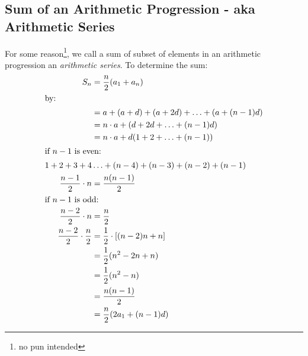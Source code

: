 \subsection{Sum of an Arithmetic Progression - aka Arithmetic Series}
\label{sec:ArithmeticSeries}
For some reason\footnote{no pun intended}, we call a sum of subset of elements
in an arithmetic progression an \emph{arithmetic series}. To determine the sum:
\begin{align}
  S_n
    &= \frac{n}{2}(a_1 + a_n) \label{eq:ArithmeticSum1}\\
  \intertext{by:}
    & = a + (a+d) + (a+2d) + \ldots + (a + (n-1)d) \\
    &= n\cdot a + (d + 2d + \ldots + (n-1)d) \\
    &= n\cdot a + d(1 + 2 + \ldots + (n-1)) \\
\intertext{if $n-1$ is even:}
    1 + 2 + 3 + 4 & \ldots + (n-4) + (n-3) + (n-2) + (n-1) \nonumber \\
    \frac{n-1}{2} \cdot n &= \frac{n(n-1)}{2} \\
\intertext{if $n-1$ is odd:}
    \frac{n-2}{2} \cdot n &= \frac{n}{2} \\
    \frac{n-2}{2} \cdot \frac{n}{2} &= \frac{1}{2}\cdot \left[(n-2)n + n\right] \\
    &= \frac{1}{2}(n^2 - 2n + n) \\
    &= \frac{1}{2}(n^2 -n) \\
    &= \frac{n(n-1)}{2} \\
    &= \frac{n}{2}(2a_1 + (n-1)d) \label{eq:ArithmeticSum2}
\end{align}

